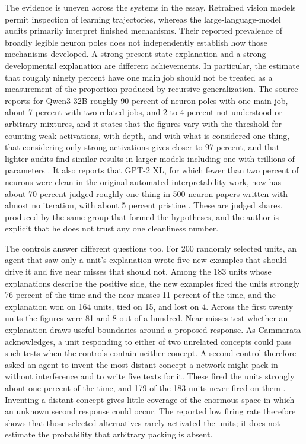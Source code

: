 \documentclass[11pt]{article}
\begin{document}
The evidence is uneven across the systems in the essay. Retrained vision models permit inspection of learning trajectories, whereas the large-language-model audits primarily interpret finished mechanisms. Their reported prevalence of broadly legible neuron poles does not independently establish how those mechanisms developed. A strong present-state explanation and a strong developmental explanation are different achievements. In particular, the estimate that roughly ninety percent have one main job should not be treated as a measurement of the proportion produced by recursive generalization. The source reports for Qwen3-32B roughly 90 percent of neuron poles with one main job, about 7 percent with two related jobs, and 2 to 4 percent not understood or arbitrary mixtures, and it states that the figures vary with the threshold for counting weak activations, with depth, and with what is considered one thing, that considering only strong activations gives closer to 97 percent, and that lighter audits find similar results in larger models including one with trillions of parameters \cite[\emph{The Short Version}]{cammarata}. It also reports that GPT-2 XL, for which fewer than two percent of neurons were clean in the original automated interpretability work, now has about 70 percent judged roughly one thing in 500 neuron papers written with almost no iteration, with about 5 percent pristine \cite[\emph{Slouching Towards Monosemanticity}]{cammarata}. These are judged shares, produced by the same group that formed the hypotheses, and the author is explicit that he does not trust any one cleanliness number.

The controls answer different questions too. For 200 randomly selected units, an agent that saw only a unit's explanation wrote five new examples that should drive it and five near misses that should not. Among the 183 units whose explanations describe the positive side, the new examples fired the units strongly 76 percent of the time and the near misses 11 percent of the time, and the explanation won on 164 units, tied on 15, and lost on 4. Across the first twenty units the figures were 81 and 8 out of a hundred. Near misses test whether an explanation draws useful boundaries around a proposed response. As Cammarata acknowledges, a unit responding to either of two unrelated concepts could pass such tests when the controls contain neither concept. A second control therefore asked an agent to invent the most distant concept a network might pack in without interference and to write five texts for it. These fired the units strongly about one percent of the time, and 179 of the 183 units never fired on them \cite[\emph{Explanations That Could Lose}]{cammarata}. Inventing a distant concept gives little coverage of the enormous space in which an unknown second response could occur. The reported low firing rate therefore shows that those selected alternatives rarely activated the units; it does not estimate the probability that arbitrary packing is absent.
\end{document}
